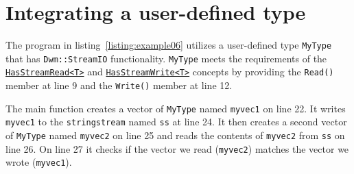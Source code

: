 \begin{minipage}{\textwidth}
  
\end{minipage}

\pagebreak
\section{Integrating a user-defined type}
\begin{minipage}{\textwidth}
  
\end{minipage}

\begin{minipage}{\textwidth}
  
\end{minipage}


The program in listing~\ref{listing:example06} utilizes a user-defined type
\texttt{MyType} that has \texttt{Dwm::StreamIO} functionality.
\texttt{MyType} meets the requirements of the
\hyperlink{concept:HasStreamRead}{\texttt{HasStreamRead<T>}}
and
\hyperlink{concept:HasStreamWrite}{\texttt{HasStreamWrite<T>}}
concepts by providing the \texttt{Read()} member at line 9 and the
\texttt{Write()} member at line 12.

\begin{minipage}{\textwidth}
  
\end{minipage}

The main function creates a vector of \texttt{MyType} named \texttt{myvec1}
on line 22.  It writes \texttt{myvec1} to the \texttt{stringstream} named
\texttt{ss} at line 24.  It then creates a second vector of \texttt{MyType}
named \texttt{myvec2} on line 25 and reads the contents of \texttt{myvec2}
from \texttt{ss} on line 26.  On line 27 it checks if the vector we
read (\texttt{myvec2}) matches the vector we wrote (\texttt{myvec1}).
